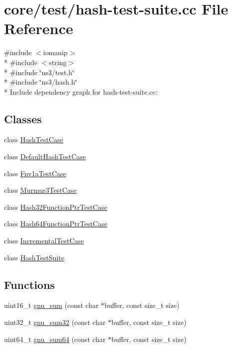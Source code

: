 \hypertarget{hash-test-suite_8cc}{}\section{core/test/hash-\/test-\/suite.cc File Reference}
\label{hash-test-suite_8cc}
{\ttfamily \#include $<$iomanip$>$}\\*
{\ttfamily \#include $<$string$>$}\\*
{\ttfamily \#include \char`\"{}ns3/test.\+h\char`\"{}}\\*
{\ttfamily \#include \char`\"{}ns3/hash.\+h\char`\"{}}\\*
Include dependency graph for hash-\/test-\/suite.cc\+:
\subsection*{Classes}
\begin{DoxyCompactItemize}
\item 
class \hyperlink{classHashTestCase}{Hash\+Test\+Case}
\item 
class \hyperlink{classDefaultHashTestCase}{Default\+Hash\+Test\+Case}
\item 
class \hyperlink{classFnv1aTestCase}{Fnv1a\+Test\+Case}
\item 
class \hyperlink{classMurmur3TestCase}{Murmur3\+Test\+Case}
\item 
class \hyperlink{classHash32FunctionPtrTestCase}{Hash32\+Function\+Ptr\+Test\+Case}
\item 
class \hyperlink{classHash64FunctionPtrTestCase}{Hash64\+Function\+Ptr\+Test\+Case}
\item 
class \hyperlink{classIncrementalTestCase}{Incremental\+Test\+Case}
\item 
class \hyperlink{classHashTestSuite}{Hash\+Test\+Suite}
\end{DoxyCompactItemize}
\subsection*{Functions}
\begin{DoxyCompactItemize}
\item 
uint16\+\_\+t \hyperlink{hash-test-suite_8cc_aaa2b6cb610fd97901f69f713d1e34238}{gnu\+\_\+sum} (const char $\ast$buffer, const size\+\_\+t size)
\item 
uint32\+\_\+t \hyperlink{hash-test-suite_8cc_a31fea16bc13f0960dc1fa95592bde055}{gnu\+\_\+sum32} (const char $\ast$buffer, const size\+\_\+t size)
\item 
uint64\+\_\+t \hyperlink{hash-test-suite_8cc_a514822542f656473e568e95575b2d346}{gnu\+\_\+sum64} (const char $\ast$buffer, const size\+\_\+t size)
\end{DoxyCompactItemize}
